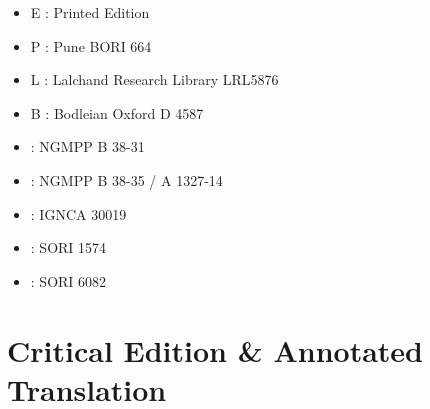 \begin{itemize}
\item E : Printed Edition
\item P : Pune BORI 664
\item L : Lalchand Research Library LRL5876
\item B : Bodleian Oxford D 4587
\item \None : NGMPP B 38-31
\item \Ntwo : NGMPP B 38-35 / A 1327-14
\item \Done : IGNCA 30019
\item \Uone : SORI 1574
\item \Utwo: SORI 6082
\end{itemize}

\chapter{Critical Edition \& Annotated Translation}
\cleardoublepage
